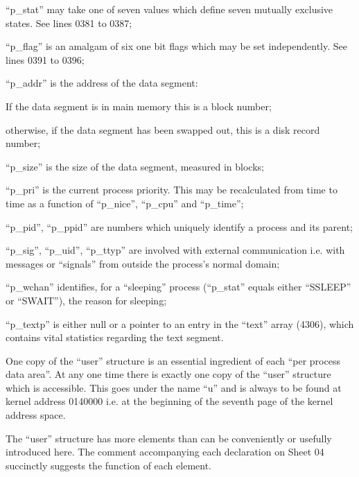 \bi
\item ``p\_stat'' may take one of seven
values which define seven mutually
exclusive states. See lines 0381
to 0387;

\item ``p\_flag'' is an amalgam of six one
bit flags which may be set
independently. See lines 0391 to
0396;

\item ``p\_addr'' is the address of the
data segment:

\bi
\item If the data segment is in main
memory this is a block number;

\item otherwise, if the data segment
has been swapped out, this is a
disk record number;
\ei

\item ``p\_size'' is the size of the data
segment, measured in blocks;

\item ``p\_pri'' is the current process
priority. This may be recalculated
from time to time as a function of
``p\_nice'', ``p\_cpu'' and ``p\_time'';

\item ``p\_pid'', ``p\_ppid'' are numbers
which uniquely identify a process
and its parent;

\item ``p\_sig'', ``p\_uid'', ``p\_ttyp'' are
involved with external communication
i.e. with messages or ``signals'' from outside the process's
normal domain;

\item ``p\_wchan'' identifies, for a
``sleeping'' process (``p\_stat''
equals either ``SSLEEP'' or
``SWAIT''), the reason for sleeping;

\item ``p\_textp'' is either null or a
pointer to an entry in the ``text''
array (4306), which contains vital
statistics regarding the text segment.
\ei


One copy of the ``user'' structure is an
essential ingredient of each ``per process data area''.
At any one time there
is exactly one copy of the ``user''
structure which is accessible. This
goes under the name ``u'' and is always
to be found at kernel address 0140000
i.e. at the beginning of the seventh
page of the kernel address space.

The ``user'' structure has more elements
than can be conveniently or usefully
introduced here. The comment accompanying
 each declaration on Sheet 04 succinctly suggests the function of each
element.

